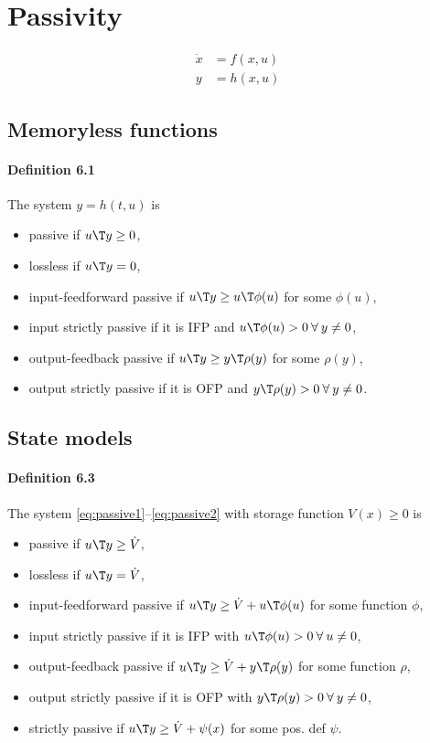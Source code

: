 \section{Passivity}
\begin{align}
	\dot{x} &= f(x,u) \label{eq:passive1} \\
	y       &= h(x,u) \label{eq:passive2}
\end{align}

\subsection{Memoryless functions}
\paragraph{Definition 6.1}
The system $y = h(t,u)$ is
\begin{itemize}
	\item passive if $u\T y \geq 0$,
	\item lossless if $u\T y = 0$,
	\item input-feedforward passive if $u\T y \geq u\T \phi(u)$ for some $\phi(u)$,
	\item input strictly passive if it is IFP and $u\T \phi(u) > 0 \: \forall \: y \neq 0$,
	\item output-feedback passive if $u\T y \geq y\T \rho(y)$ for some $\rho(y)$,
	\item output strictly passive if it is OFP and $y\T \rho(y) > 0 \: \forall \: y \neq 0$.
\end{itemize}

\subsection{State models}
\paragraph{Definition 6.3}
The system \eqref{eq:passive1}--\eqref{eq:passive2} with storage function $V(x) \geq 0$ is
\begin{itemize}
	\item passive if $u\T y \geq \dot{V}$,
	\item lossless if $u\T y = \dot{V}$,
	\item input-feedforward passive if $u\T y \geq \dot{V} + u\T \phi(u)$ for some function $\phi$,
	\item input strictly passive if it is IFP with $u\T \phi(u) > 0 \: \forall \: u \neq 0$,
	\item output-feedback passive if $u\T y \geq \dot{V} + y\T \rho(y)$ for some function $\rho$,
	\item output strictly passive if it is OFP with $y\T \rho(y) > 0 \: \forall \: y \neq 0$,
	\item strictly passive if $u\T y \geq \dot{V} + \psi(x)$ for some pos. def $\psi$.
\end{itemize}

